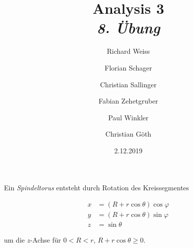 \documentclass{article}
\title
{
  Analysis 3 \\
  \vspace{4pt}
  \normalsize
  \textit{8. Übung}
}
\author
{
  Richard Weiss
  \and
  Florian Schager
  \and
  Christian Sallinger
  \and
  Fabian Zehetgruber
  \and
  Paul Winkler
  \and
  Christian Göth
}
\date{2.12.2019}
\begin{document}
\maketitle

Ein \textit{Spindeltorus} entsteht durch Rotation des Kreissegmentes

\begin{align*}
  x & = (R + r \cos \theta) \cos \varphi \\
  y & = (R + r \cos \theta) \sin \varphi \\
  z & = \sin \theta
\end{align*}

um die $z$-Achse für $0 < R < r$, $R + r \cos \theta \geq 0$.












\printbibliography
\end{document}
